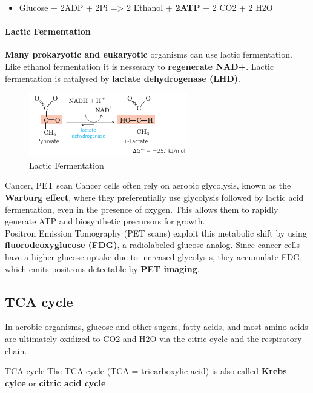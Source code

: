 \documentclass[../main.tex]{subfiles}
\begin{document}
\begin{itemize}
	\item Glucose + 2ADP + 2Pi => 2 Ethanol + \textbf{2ATP} + 2 CO2 + 2 H2O
\end{itemize}

\paragraph{Lactic Fermentation}
\textbf{Many prokaryotic and eukaryotic} organisms can use lactic fermentation. Like ethanol fermentation it is nessesary to \textbf{regenerate NAD+}. Lactic fermentation is catalysed by \textbf{lactate dehydrogenase (LHD)}. 

\begin{figure}[H]
	\centering
	\includegraphics[width = 0.6 \textwidth]{lactic}
	\caption{Lactic Fermentation}
\end{figure}

\begin{RemarkWithTitel}{Cancer, PET scan}
	Cancer cells often rely on aerobic glycolysis, known as the\textbf{ Warburg effect}, where they preferentially use glycolysis followed by lactic acid fermentation, even in the presence of oxygen. This allows them to rapidly generate ATP and biosynthetic precursors for growth.\\
	Positron Emission Tomography (PET scans) exploit this metabolic shift by using \textbf{fluorodeoxyglucose (FDG)}, a radiolabeled glucose analog. Since cancer cells have a higher glucose uptake due to increased glycolysis, they accumulate FDG, which emits positrons detectable by \textbf{PET imaging}.
\end{RemarkWithTitel}


\subsection{TCA cycle}
In aerobic organisms, glucose and other sugars, fatty acids, and most amino acids are ultimately oxidized to CO2 and H2O via the citric cycle and the respiratory chain. 

\begin{RemarkWithTitel}{TCA cycle}
	The TCA cycle (TCA = tricarboxylic acid) is also called \textbf{Krebs cylce} or \textbf{citric acid cycle}
\end{RemarkWithTitel}
\end{document}
